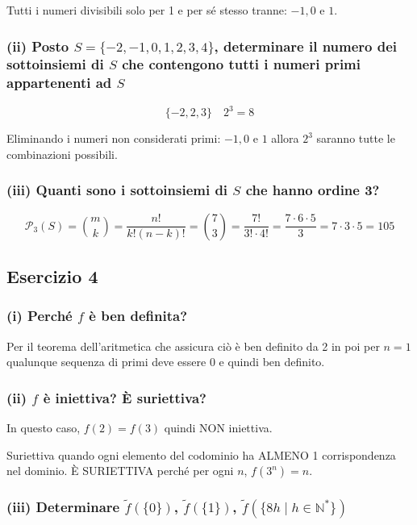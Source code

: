 Tutti i numeri divisibili solo per 1 e per sé stesso tranne: $-1, 0$ e $1$.

\subsubsection*{(ii) Posto $S = \{-2, -1, 0, 1, 2, 3, 4\}$, determinare il numero dei sottoinsiemi di $S$ che contengono tutti i numeri primi appartenenti ad $S$}

$$\{-2, 2, 3\} \quad 2^3 = 8$$

Eliminando i numeri non considerati primi: $-1, 0$ e $1$ allora $2^3$ saranno tutte le combinazioni possibili.

\subsubsection*{(iii) Quanti sono i sottoinsiemi di $S$ che hanno ordine 3?}

$$\mathcal{P}_3(S) = \binom{m}{k} = \frac{n!}{k!(n-k)!} = \binom{7}{3} = \frac{7!}{3! \cdot 4!} = \frac{7 \cdot 6 \cdot 5}{3} = 7 \cdot 3 \cdot 5 = 105$$

\subsection*{Esercizio 4}

\subsubsection*{(i) Perché $f$ è ben definita?}

Per il teorema dell'aritmetica che assicura ciò è ben definito da 2 in poi per $n = 1$ qualunque sequenza di primi deve essere 0 e quindi ben definito.

\subsubsection*{(ii) $f$ è iniettiva? È suriettiva?}

In questo caso, $f(2) = f(3)$ quindi NON iniettiva.

Suriettiva quando ogni elemento del codominio ha ALMENO 1 corrispondenza nel dominio. È SURIETTIVA perché per ogni $n$, $f(3^n) = n$.

\subsubsection*{(iii) Determinare $\tilde{f}(\{0\})$, $\tilde{f}(\{1\})$, $\tilde{f}(\{8h \mid h \in \mathbb{N}^*\})$}

